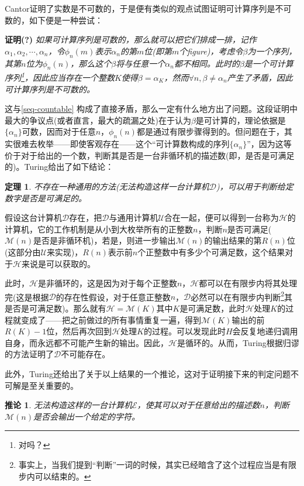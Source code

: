 \documentclass[8pt]{article}
\newtheorem{theorem}{定理}
\newtheorem{corollary}{推论}
\begin{document}
Cantor证明了实数是不可数的\cite{Cantor}，于是便有类似的观点试图证明可计算序列是不可数的，如下便是一种尝试：

\textbf{证明(?)} \textit{如果可计算序列是可数的，那么就可以把它们排成一排，记作$\alpha_1, \alpha_2, \cdots, \alpha_n$，令$\phi_n(m)$表示$\alpha_n$的第$m$位(即第$m$个figure)，考虑令$\beta$为一个序列，其第$n$位为$\phi_n(n)$，那么这个$\beta$将与任意一个$\alpha_n$都不相同。此时的$\beta$是一个可计算序列\footnote{对吗？}，因此应当存在一个整数$K$使得$\beta = \alpha_K$，然而$\forall n, \beta \neq \alpha_n$产生了矛盾，因此可计算序列是不可数的。
}

这与\cref{seq-countable} 构成了直接矛盾，那么一定有什么地方出了问题。这段证明中最大的争议点(或者直言，最大的疏漏之处)在于认为$\beta$是可计算的，理论依据是$\{\alpha_n\}$可数，因而对于任意$n$，$\phi_n(n)$都是通过有限步骤得到的。但问题在于，其实很难去枚举——即使客观存在——这个“可计算数构成的序列$\{\alpha_n\}$”，因为这等价于对于给出的一个数，判断其是否是一台非循环机的描述数(即，是否是可满足的)。Turing给出了如下结论：

\begin{theorem}
	不存在一种通用的方法(无法构造这样一台计算机$\mathcal D$)，可以用于判断给定数字是否是可满足的。
\end{theorem}

假设这台计算机$\mathcal D$存在，把$\mathcal D$与通用计算机$\mathcal U$合在一起，便可以得到一台称为$\mathcal H$的计算机，它的工作机制是从小到大枚举所有的正整数$n$，判断$n$是否可满足($\mathcal M(n)$是否是非循环机)，若是，则进一步输出$\mathcal M(n)$的输出结果的第$R(n)$位(这部分由$\mathcal U$来实现)，$R(n)$表示前$n$个正整数中有多少个可满足数，这个结果对于$\mathcal H$来说是可以获取的。

此时，$\mathcal H$是非循环的，这是因为对于每个正整数$n$，$\mathcal H$都可以在有限步内将其处理完(这是根据$\mathcal D$的存在性假设，对于任意正整数$n$，$\mathcal D$必然可以在有限步内判断\footnote{事实上，当我们提到“判断”一词的时候，其实已经暗含了这个过程应当是有限步内可以结束的。}其是否是可满足数)。那么就有$\mathcal H = \mathcal M(K)$其中$K$是可满足数，此时$\mathcal H$处理$K$的过程就变成了——把之前做过的所有事情重复一遍，得到$\mathcal M(K)$输出的前$R(K)-1$位，然后再次回到$\mathcal H$处理$K$的过程。可以发现此时$H$会反复地递归调用自身，而永远都不可能产生新的输出。因此，$\mathcal H$是循环的。从而，Turing根据归谬的方法证明了$\mathcal D$不可能存在。

此外，Turing还给出了关于以上结果的一个推论，这对于证明接下来的判定问题不可解是至关重要的。

\begin{corollary}
无法构造这样的一台计算机$\mathcal E$，使其可以对于任意给出的描述数$n$，判断$\mathcal M(n)$是否会输出一个给定的字符。
\label{output0}
\end{corollary}
\end{document}
